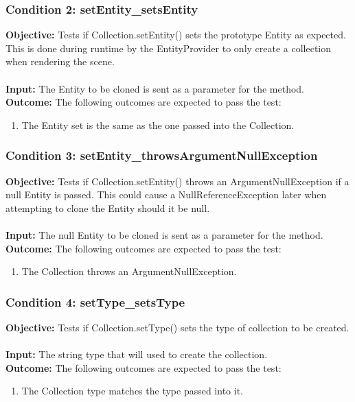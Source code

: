 \documentclass[a4paper,12pt]{article}
\begin{document}
		\subsubsection{Condition 2: setEntity\_setsEntity}
			\textbf{Objective:} Tests if Collection.setEntity() sets the prototype Entity as expected. This is done during runtime by the EntityProvider to only create a collection when rendering the scene.\\\\
			\textbf{Input:} The Entity to be cloned is sent as a parameter for the method.\\
			\textbf{Outcome:} The following outcomes are expected to pass the test:
				\begin{enumerate}
					\item The Entity set is the same as the one passed into the Collection.
				\end{enumerate}
		\subsubsection{Condition 3: setEntity\_throwsArgumentNullException}
			\textbf{Objective:} Tests if Collection.setEntity() throws an ArgumentNullException if a null Entity is passed. This could cause a NullReferenceException later when attempting to clone the Entity should it be null.\\\\
			\textbf{Input:} The  null Entity to be cloned is sent as a parameter for the method.\\
			\textbf{Outcome:} The following outcomes are expected to pass the test:
				\begin{enumerate}
					\item The Collection throws an ArgumentNullException.
				\end{enumerate}
		\subsubsection{Condition 4: setType\_setsType}
			\textbf{Objective:} Tests if Collection.setType() sets the type of collection to be created.\\\\
			\textbf{Input:} The string type that will used to create the collection.\\
			\textbf{Outcome:} The following outcomes are expected to pass the test:
				\begin{enumerate}
					\item The Collection type matches the type passed into it.
				\end{enumerate}
\end{document}
